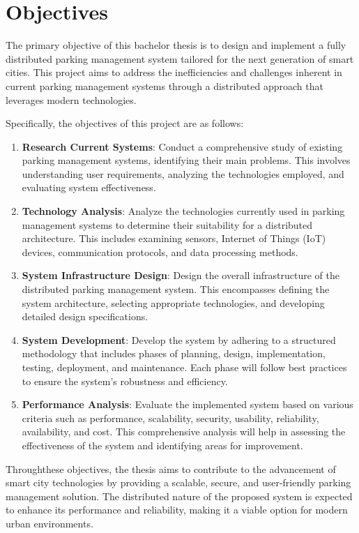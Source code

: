 \chapter{Objectives}\label{ch:objectives}

The primary objective of this bachelor thesis is to design and implement a fully distributed parking management system tailored for the next generation of smart cities. This project aims to address the inefficiencies and challenges inherent in current parking management systems through a distributed approach that leverages modern technologies.

Specifically, the objectives of this project are as follows:

\begin{enumerate}
  \item \textbf{Research Current Systems}: Conduct a comprehensive study of existing parking management systems, identifying their main problems. This involves understanding user requirements, analyzing the technologies employed, and evaluating system effectiveness.

  \item \textbf{Technology Analysis}: Analyze the technologies currently used in parking management systems to determine their suitability for a distributed architecture. This includes examining sensors, Internet of Things (IoT) devices, communication protocols, and data processing methods.

  \item \textbf{System Infrastructure Design}: Design the overall infrastructure of the distributed parking management system. This encompasses defining the system architecture, selecting appropriate technologies, and developing detailed design specifications.

  \item \textbf{System Development}: Develop the system by adhering to a structured methodology that includes phases of planning, design, implementation, testing, deployment, and maintenance. Each phase will follow best practices to ensure the system's robustness and efficiency.

  \item \textbf{Performance Analysis}: Evaluate the implemented system based on various criteria such as performance, scalability, security, usability, reliability, availability, and cost. This comprehensive analysis will help in assessing the effectiveness of the system and identifying areas for improvement.
\end{enumerate}

Throughthese objectives, the thesis aims to contribute to the advancement of smart city technologies by providing a scalable, secure, and user-friendly parking management solution. The distributed nature of the proposed system is expected to enhance its performance and reliability, making it a viable option for modern urban environments.
